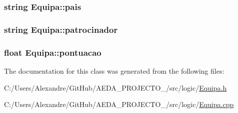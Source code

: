 \subsubsection[{pais}]{\setlength{\rightskip}{0pt plus 5cm}string Equipa\+::pais\hspace{0.3cm}{\ttfamily [private]}}\label{class_equipa_a9972aebf308a7adcd5e23d127639311f}
\hypertarget{class_equipa_ac9a1c45750e118888d61930c3bf4d185}{}
\subsubsection[{patrocinador}]{\setlength{\rightskip}{0pt plus 5cm}string Equipa\+::patrocinador\hspace{0.3cm}{\ttfamily [private]}}\label{class_equipa_ac9a1c45750e118888d61930c3bf4d185}
\hypertarget{class_equipa_a1b047e8ef3d73dd54b656af9dbfcf9ae}{}
\subsubsection[{pontuacao}]{\setlength{\rightskip}{0pt plus 5cm}float Equipa\+::pontuacao\hspace{0.3cm}{\ttfamily [private]}}\label{class_equipa_a1b047e8ef3d73dd54b656af9dbfcf9ae}


The documentation for this class was generated from the following files\+:\begin{DoxyCompactItemize}
\item 
C\+:/\+Users/\+Alexandre/\+Git\+Hub/\+A\+E\+D\+A\+\_\+\+P\+R\+O\+J\+E\+C\+T\+O\+\_/src/logic/\hyperlink{_equipa_8h}{Equipa.\+h}\item 
C\+:/\+Users/\+Alexandre/\+Git\+Hub/\+A\+E\+D\+A\+\_\+\+P\+R\+O\+J\+E\+C\+T\+O\+\_/src/logic/\hyperlink{_equipa_8cpp}{Equipa.\+cpp}\end{DoxyCompactItemize}
